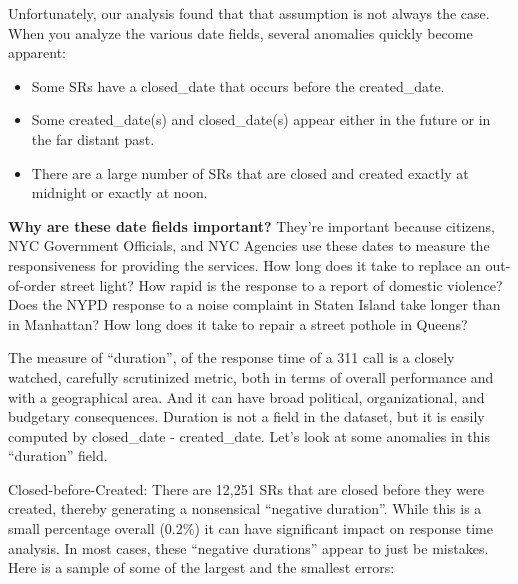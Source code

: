 \documentclass[12pt, titlepage]{article}
\begin{document}
	Unfortunately, our analysis found that that assumption is not always 
	the case. When you analyze the various date fields, several anomalies 
	quickly become apparent:
	
	\begin{itemize}
		\item Some SRs have a closed\_date that occurs before the created\_date.
	 	\item Some created\_date(s) and closed\_date(s) appear either in 
	 	the future or in the far distant past.
		\item There are a large number of SRs that are closed and created 
		exactly at midnight or exactly at noon. 
	\end{itemize}
	
	\textbf{Why are these date fields important?} They're important because 
	citizens, NYC Government Officials, and NYC Agencies use these 
	dates to measure the responsiveness for providing the 
	services. How long does it take to replace an out-of-order 
	street light? How rapid is the response to a report of domestic 
	violence? Does the NYPD response to a noise complaint in 
	Staten Island take longer than in Manhattan? How long does it 
	take to repair a street pothole in Queens? 
	
	The measure of ``duration'', of the response time of a 311 call is a closely 
	watched, carefully scrutinized metric, both in terms of overall performance 
	and with a geographical area. And it can have broad political, organizational, 
	and budgetary consequences. Duration is not a field in the dataset, 
	but it is easily computed by closed\_date - created\_date. Let's look at 
	some anomalies in this ``duration'' field.
	
	Closed-before-Created:  There are 12,251 SRs that are closed before they 
	were created, thereby generating a nonsensical ``negative duration''. 
	While this is a small percentage overall (0.2\%) it can have significant impact 
	on response time analysis. In most cases, these ``negative durations'' 
	appear to just be mistakes. Here is a sample of some of the 
	largest and the smallest errors:
	
\end{document}
